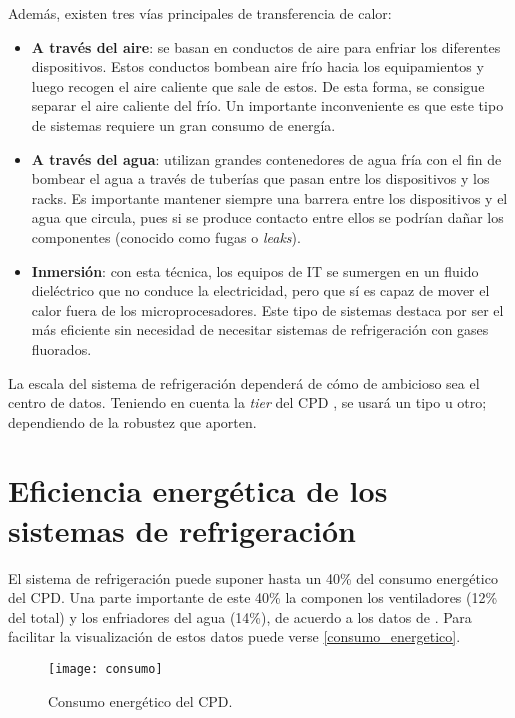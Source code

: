 Además, existen tres vías principales de transferencia de calor:

\begin{itemize}
    \item \textbf{A través del aire}: se basan en conductos de aire para enfriar los diferentes dispositivos. Estos conductos bombean aire frío hacia los equipamientos y luego recogen el aire caliente que sale de estos. De esta forma, se consigue separar el aire caliente del frío. Un importante inconveniente es que este tipo de sistemas requiere un gran consumo de energía.
    \item \textbf{A través del agua}: utilizan grandes contenedores de agua fría con el fin de bombear el agua a través de tuberías que pasan entre los dispositivos y los racks. Es importante mantener siempre una barrera entre los dispositivos y el agua que circula, pues si se produce contacto entre ellos se podrían dañar los componentes (conocido como fugas o \textit{leaks}).
    \item \textbf{Inmersión}: con esta técnica, los equipos de IT se sumergen en un fluido dieléctrico que no conduce la electricidad, pero que sí es capaz de mover el calor fuera de los microprocesadores. Este tipo de sistemas destaca por ser el más eficiente sin necesidad de necesitar sistemas de refrigeración con gases fluorados.
\end{itemize}

La escala del sistema de refrigeración dependerá de cómo de ambicioso sea el centro de datos. Teniendo en cuenta la \textit{tier} del CPD \cite{cofrico}, se usará un tipo u otro; dependiendo de la robustez que aporten.

\section{Eficiencia energética de los sistemas de refrigeración}

El sistema de refrigeración puede suponer hasta un 40\% del consumo energético del CPD. Una parte importante de este 40\% la componen los ventiladores (12\% del total) y los enfriadores del agua (14\%), de acuerdo a los datos de \cite{ZHANG2021102253}. Para facilitar la visualización de estos datos puede verse \eqref{consumo_energetico}.

\begin{figure}
    \begin{center}
        \texttt{[image: consumo]}
        \caption{Consumo energético del CPD.}
        \label{consumo_energetico}
    \end{center}
\end{figure}

